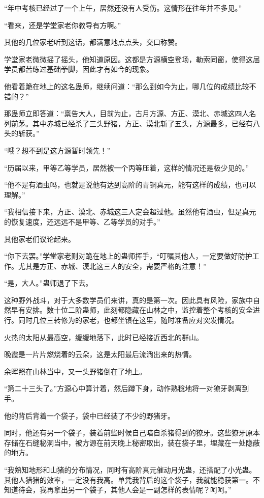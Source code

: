 \begin{this_body}
“年中考核已经过了一个上午，居然还没有人受伤。这情形在往年并不多见。”

“看来，还是学堂家老你教导有方啊。”

其他的几位家老听到这话，都满意地点点头，交口称赞。

学堂家老微微摇了摇头，他知道原因。这都是方源横空登场，勒索同窗，使得这届学员都苦练过基础拳脚，因此才有如今的现象。

他看着跪在地上的这名蛊师，继续问道：“那么到如今为止，哪几位的成绩比较不错的？”

那蛊师立即答道：“禀告大人，目前为止，古月方源、方正、漠北、赤城这四人名列前茅。其中赤城已经杀了三头野猪，方正、漠北斩了五头，方源最多，已经有八头的斩获。”

“哦？想不到是这方源暂时领先！”

“历届以来，甲等乙等学员，居然被一个丙等压着，这样的情况还是极少见的。”

“他不是有酒虫吗，也就是说他有达到高阶的青铜真元，能有这样的成绩，也可以理解。”

“我相信接下来，方正、漠北、赤城这三人定会超过他。虽然他有酒虫，但是真元的恢复速度，还远远不是甲等、乙等学员的对手。”

其他家老们议论起来。

“你下去罢。”学堂家老则对跪在地上的蛊师挥手，“叮嘱其他人，一定要做好防护工作。尤其是方正、赤城、漠北这三人的安全，需要严格的注意！”

“是，大人。”蛊师退了下去。

这种野外战斗，对于大多数学员们来讲，真的是第一次。因此具有风险，家族中自然早有安排。数十位二阶蛊师，此刻都隐藏在山林之中，监控着整个考核的安全进行。同时几位三转修为的家老，也都坐镇在这里，随时准备应对突发情况。

火热的太阳从最高空，缓缓地落下，此时已经接近西北的群山。

晚霞是一片片燃烧着的云朵，这是太阳最后流淌出来的热情。

余晖照在山林当中，又一头野猪倒在了地上。

“第二十三头了。”方源心中算计着，然后蹲下身，动作熟稔地将一对獠牙剥离到手。

他的背后背着一个袋子，袋中已经装了不少的野猪牙。

同时，他还有另一个袋子，装着前些时候自己暗自杀猪得到的獠牙。这些獠牙原本存储在石缝秘洞当中，被方源在前天晚上秘密取出，装在袋子里，埋藏在一处隐蔽的地方。

“我熟知地形和山猪的分布情况，同时有高阶真元催动月光蛊，还搭配了小光蛊。其他人猎猪的效率，一定没有我高。单凭我背后的这个袋子，我就能稳获第一。不知道待会，我再拿出另一个袋子，其他人会是一副怎样的表情呢？呵呵。”


\end{this_body}
